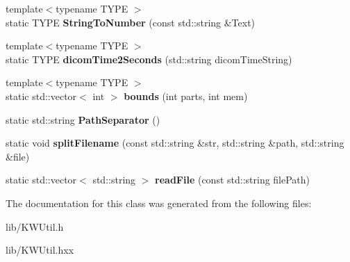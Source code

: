 \begin{DoxyCompactItemize}
\item 
\hypertarget{class_k_w_util_adea4c36750f518d1f2c90af14742a0f6}{{\footnotesize template$<$typename T\-Y\-P\-E $>$ }\\static T\-Y\-P\-E {\bfseries String\-To\-Number} (const std\-::string \&Text)}\label{class_k_w_util_adea4c36750f518d1f2c90af14742a0f6}

\item 
\hypertarget{class_k_w_util_a21813a6377e55fa15c70f64afb2feb51}{{\footnotesize template$<$typename T\-Y\-P\-E $>$ }\\static T\-Y\-P\-E {\bfseries dicom\-Time2\-Seconds} (std\-::string dicom\-Time\-String)}\label{class_k_w_util_a21813a6377e55fa15c70f64afb2feb51}

\item 
\hypertarget{class_k_w_util_a498350d10204849240a945ea682ecc98}{{\footnotesize template$<$typename T\-Y\-P\-E $>$ }\\static std\-::vector$<$ int $>$ {\bfseries bounds} (int parts, int mem)}\label{class_k_w_util_a498350d10204849240a945ea682ecc98}

\item 
\hypertarget{class_k_w_util_a19d7a4b4320a3b9d8ff06e4d296e2893}{static std\-::string {\bfseries Path\-Separator} ()}\label{class_k_w_util_a19d7a4b4320a3b9d8ff06e4d296e2893}

\item 
\hypertarget{class_k_w_util_afe6ad66b5fe06a8b42918634076ab056}{static void {\bfseries split\-Filename} (const std\-::string \&str, std\-::string \&path, std\-::string \&file)}\label{class_k_w_util_afe6ad66b5fe06a8b42918634076ab056}

\item 
\hypertarget{class_k_w_util_a70a639cebc8982645a9ba44f73b93d85}{static std\-::vector$<$ std\-::string $>$ {\bfseries read\-File} (const std\-::string file\-Path)}\label{class_k_w_util_a70a639cebc8982645a9ba44f73b93d85}

\end{DoxyCompactItemize}


The documentation for this class was generated from the following files\-:\begin{DoxyCompactItemize}
\item 
lib/K\-W\-Util.\-h\item 
lib/K\-W\-Util.\-hxx\end{DoxyCompactItemize}

